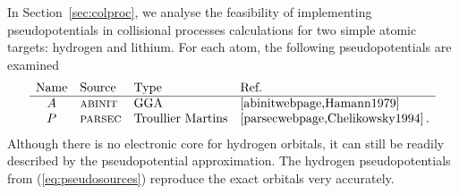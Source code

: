 \documentclass[10pt]{article}
\begin{document}
In Section~\ref{sec:colproc}, we analyse the feasibility of 
implementing pseudopotentials in collisional processes calculations for two 
simple atomic targets: hydrogen and lithium. For each atom, the 
following pseudopotentials are examined
\begin{equation}
 \begin{array}{clll}
  \mbox{Name} & \mbox{Source} & \mbox{Type} & \mbox{Ref.} \\
  \hline  
  A & \mbox{\sc abinit} & \mbox{GGA} & \cite{abinitwebpage,Hamann1979} \\
  P & \mbox{\sc parsec} & \mbox{Troullier Martins} & \cite{parsecwebpage,Chelikowsky1994}\,.
 \end{array}
 \label{eq:pseudosources}
\end{equation}
Although there is no electronic core for hydrogen orbitals, it
can still be readily described by the pseudopotential 
approximation. The hydrogen pseudopotentials from 
(\ref{eq:pseudosources}) reproduce the exact orbitals very 
accurately. 
\end{document}
